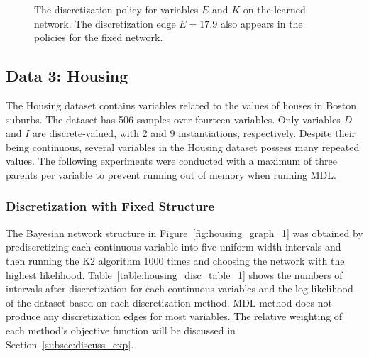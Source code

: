 \begin{figure}[ht]
  \centering
  
  \caption{
    The discretization policy for variables $E$ and $K$ on the learned network.
    The discretization edge $E = 17.9$ also appears in the policies for the fixed network.
  }
  \label{fig:wine_exp2_distr}
\end{figure}
%
%
\subsection{Data 3: Housing}
\label{subsec:housing}

The Housing dataset contains variables related to the values of houses in Boston suburbs.
The dataset has \num{506} samples over fourteen variables.
Only variables $D$ and $I$ are discrete-valued, with \num{2} and \num{9} instantiations, respectively.
Despite their being continuous, several variables in the Housing dataset possess many repeated values.
The following experiments were conducted with a maximum of three parents per variable to prevent running out of memory when running MDL.

\subsubsection{Discretization with Fixed Structure}
\label{subsubsec:housing_exp1}

The Bayesian network structure in Figure~\ref{fig:housing_graph_1} was obtained by prediscretizing each continuous variable into five uniform-width intervals and then running the K2 algorithm \num{1000} times and choosing the network with the highest likelihood.
Table~\ref{table:housing_disc_table_1} shows the numbers of intervals after discretization for each continuous variables and the log-likelihood of the dataset based on each discretization method.
MDL method does not produce any discretization edges for most variables.
The relative weighting of each method's objective function will be discussed in Section~\ref{subsec:discuss_exp}.

